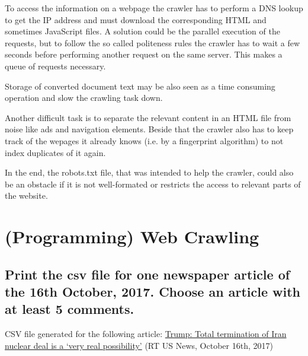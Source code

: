 \documentclass{scrartcl}
\begin{document}
To access the information on a webpage the crawler has to perform a DNS lookup to get the IP address and must download the corresponding HTML and sometimes JavaScript files. A solution could be the parallel execution of the requests, but to follow the so called politeness rules the crawler has to wait a few seconds before performing another request on the same server. This makes a queue of requests necessary. 

Storage of converted document text may be also seen as a time consuming operation and slow the crawling task down.

Another difficult task is to separate the relevant content in an HTML file from noise like ads and navigation elements. Beside that the crawler also has to keep track of the wepages it already knows (i.e. by a fingerprint algorithm) to not index duplicates of it again.

In the end, the robots.txt file, that was intended to help the crawler, could also be an obstacle if it is not well-formated or restricts the access to relevant parts of the website.

\section{(Programming) Web Crawling}

\subsection{Print the csv file for one newspaper article of the 16th October, 2017. Choose an article with
	at least 5 comments. }

CSV file generated for the following article:
\href{http://www.rt.com/usa/406881-trump-says-total-termination-of-iran-deal-possible/}{Trump: Total termination of Iran nuclear deal is a ‘very real possibility’} (RT US News, October 16th, 2017)
\end{document}
